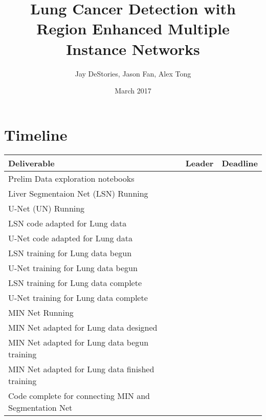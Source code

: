 \documentclass[10pt]{article}
\title{Lung Cancer Detection with \\Region Enhanced 
Multiple Instance Networks}
\author{Jay DeStories, Jason Fan, Alex Tong}
\date{March 2017}
\begin{document}
\section{Timeline}
\begin{tabular}{l | l | l }
Deliverable & Leader & Deadline\\
\hline
Prelim Data exploration notebooks & & \\
Liver Segmentaion Net (LSN) Running & & \\
U-Net (UN) Running & & \\
LSN code adapted for Lung data & & \\
U-Net code adapted for Lung data & & \\
LSN training for Lung data begun & & \\
U-Net training for Lung data begun & & \\
LSN training for Lung data complete & & \\
U-Net training for Lung data complete & & \\

\hline
MIN Net Running & & \\
MIN Net adapted for Lung data designed & & \\
MIN Net adapted for Lung data begun training & & \\
MIN Net adapted for Lung data finished training & & \\

\hline
Code complete for connecting MIN and Segmentation Net
\end{tabular}
\end{document}

